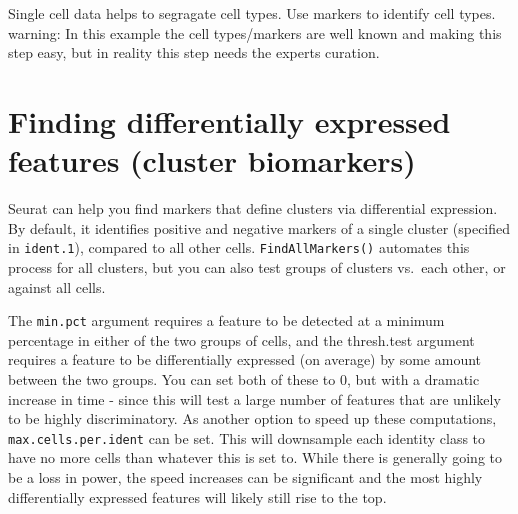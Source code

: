 \documentclass[
]{book}
\begin{document}
Single cell data helps to segragate cell types. Use markers to identify cell types. warning: In this example the cell types/markers are well known and making this step easy, but in reality this step needs the experts curation.

\subsubsection*{}\label{section-10}

\section{Finding differentially expressed features (cluster biomarkers)}\label{finding-differentially-expressed-features-cluster-biomarkers}

Seurat can help you find markers that define clusters via differential expression. By default, it identifies positive and negative markers of a single cluster (specified in \texttt{ident.1}), compared to all other cells. \texttt{FindAllMarkers()} automates this process for all clusters, but you can also test groups of clusters vs.~each other, or against all cells.

The \texttt{min.pct} argument requires a feature to be detected at a minimum percentage in either of the two groups of cells, and the thresh.test argument requires a feature to be differentially expressed (on average) by some amount between the two groups. You can set both of these to 0, but with a dramatic increase in time - since this will test a large number of features that are unlikely to be highly discriminatory. As another option to speed up these computations, \texttt{max.cells.per.ident} can be set. This will downsample each identity class to have no more cells than whatever this is set to. While there is generally going to be a loss in power, the speed increases can be significant and the most highly differentially expressed features will likely still rise to the top.
\end{document}
